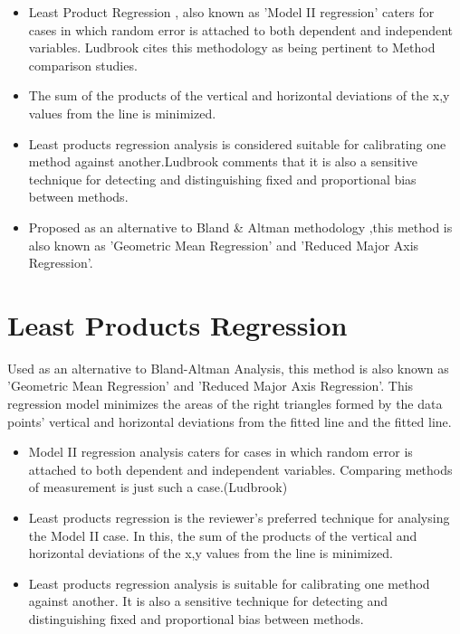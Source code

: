 \documentclass[12pt, a4paper]{report}
\theoremstyle{plain}
\theoremstyle{definition}
\theoremstyle{remark}
\begin{document}
\begin{itemize}
	\item Least Product Regression , also known as 'Model II regression'
	caters for cases in which random error is attached to both
	dependent and independent variables. Ludbrook cites this
	methodology as being pertinent to Method comparison studies.
	
	\item 
	The sum of the products of the vertical and horizontal deviations
	of the x,y values from the line is minimized.
	
	\item 
	Least products regression analysis is considered suitable for
	calibrating one method against another.Ludbrook comments that it
	is also a sensitive technique for detecting and distinguishing
	fixed and proportional bias between methods.
	
	\item 
	Proposed as an alternative to Bland \& Altman methodology ,this
	method is also known as 'Geometric Mean Regression' and 'Reduced
	Major Axis Regression'.
\end{itemize}





\section{Least Products Regression}
Used as an alternative to Bland-Altman Analysis, this method is also known as 'Geometric Mean Regression' and 'Reduced Major Axis Regression'. This regression model minimizes the areas of the right triangles formed by the data points' vertical and horizontal deviations from the fitted line and the fitted line.

\begin{itemize}
	\item Model II regression analysis caters for cases in which random error is attached to both dependent and independent variables. Comparing methods of measurement is just such a case.(Ludbrook)
	
	\item Least products regression is the reviewer's preferred technique for analysing the Model II case. In this, the sum of the products of the vertical and horizontal deviations of the x,y values from the line is minimized.
	
	\item Least products regression analysis is suitable for calibrating one method against another. It is also a sensitive technique for detecting and distinguishing fixed and proportional bias between
	methods.
\end{itemize}
\end{document}
